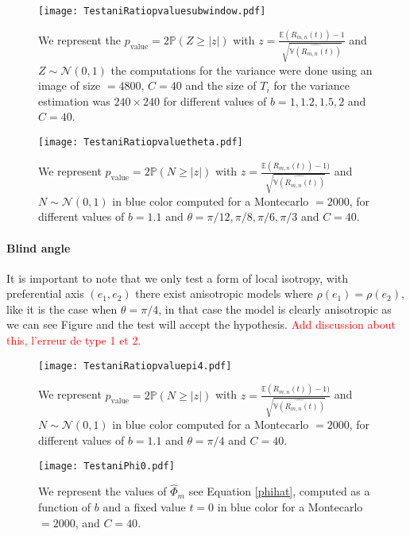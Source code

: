 \documentclass[12pt]{article}
\renewcommand{\hat}{\widehat}
\theoremstyle{Theorem}
\theoremstyle{definition}
\begin{document}
\begin{figure}[H]
  \centering
    {\texttt{[image: TestaniRatiopvaluesubwindow.pdf]}}
    \hspace{0.2cm} 
 \caption{We represent the $p_{\text{value}} = 2\mathbb{P}\left(Z \geq |z|\right)$ with $z = \frac{\mathbb{E}\left(R_{m,n}(t)\right) - 1}{\sqrt{\hat{\mathbb{V}\left(R_{m, n}(t)\right)}}}$ and $Z \sim \mathcal{N}(0,1)$ the computations for the variance were done using an image of size $= 4800$, $C = 40$ and the size of $T_{i}$ for the variance estimation was $240\times240$  for different values of $b = 1, 1.2, 1.5, 2$ and $C = 40$.}

\end{figure}
\begin{figure}[H]
  \centering
    {\texttt{[image: TestaniRatiopvaluetheta.pdf]}}
    \hspace{0.2cm} 
 \caption{We represent $p_{\text{value}} = 2\mathbb{P}\left(N \geq |z|\right)$ with $z = \frac{\mathbb{E}\left(R_{m,n}(t)\right) - 1)}{\sqrt{\hat{\mathbb{V}\left(R_{m, n}(t)\right)}}}$ and $N \sim \mathcal{N}(0,1)$ in blue color computed for a Montecarlo $= 2000$, for different values of $b = 1.1$ and $\theta = \pi/12, \pi/8, \pi/6, \pi/3$ and $C = 40$.}
\end{figure}

\paragraph{Blind angle}It is important to note that we only test a form of local isotropy, with preferential axis $(e_1,e_2)$ there exist anisotropic models where $\rho(e_1) = \rho(e_2)$, like it is the case when $\theta = \pi/4$, in that case the model is clearly anisotropic as we can see Figure and the test will accept the hypothesis. \textcolor{red}{Add discussion about this, l'erreur de type 1 et 2.}
\begin{figure}[H]
  \centering
    {\texttt{[image: TestaniRatiopvaluepi4.pdf]}}
    \hspace{0.2cm} 
 \caption{We represent $p_{\text{value}} = 2\mathbb{P}\left(N \geq |z|\right)$ with $z = \frac{\mathbb{E}\left(R_{m,n}(t)\right) - 1)}{\sqrt{\hat{\mathbb{V}\left(R_{m, n}(t)\right)}}}$ and $N \sim \mathcal{N}(0,1)$ in blue color computed for a Montecarlo $= 2000$, for different values of $b = 1.1$ and $\theta = \pi/4$ and $C = 40$.}
\end{figure}
\begin{figure}[H]
  \centering
    {\texttt{[image: TestaniPhi0.pdf]}}
    \hspace{0.2cm} 
 \caption{We represent the values of $\hat{\Phi}_{m}$ see Equation \eqref{phihat}, computed as a function of $b$ and a fixed value $t=0$ in blue color for a Montecarlo $= 2000$, and $C = 40$.}
\end{figure}
\end{document}
